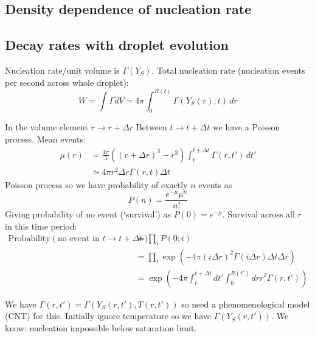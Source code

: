 \documentclass[12pt]{report}
\begin{document}
\subsection{Density dependence of nucleation rate}
\subsection{Decay rates with droplet evolution}

Nucleation rate/unit volume is $\Gamma(Y_S)$.
Total nucleation rate (nucleation events per second across whole droplet):
\begin{equation}
  W = \int \Gamma dV
  = 4\pi \int_0^{R(t)} \Gamma(Y_S(r); t) \, dr
\end{equation}

In the volume element $r \to r + \Delta r$ Between $t \to t+\Delta t$ we have a Poisson process.
Mean events:
\begin{equation}
  \begin{aligned}
    \mu(r) &= \frac{4\pi}{3} ( (r+\Delta r)^3 - r^3)
    \int_t^{t+\Delta t} \Gamma(r,t') \, dt' \\
    &\simeq
    4\pi r^2 \Delta r \Gamma(r, t) \Delta t
  \end{aligned}
\end{equation}
Poisson process so we have probability of exactly $n$ events as
\begin{equation}
  P(n) = \frac{e^{-\mu} \mu^n}{n!}
\end{equation}
Giving probability of no event (`survival') as $P(0) = e^{-\mu}$.
Survival across all $r$ in this time period:
\begin{equation}
  \begin{aligned}
  \textrm{Probability}\left( \textrm{no event in } t \to t + \Delta t \right)
  &= \prod_i P(0;i) \\
  &= \prod_i \exp{\left(-4\pi (i\Delta r)^2 \Gamma(i\Delta r) \Delta t \Delta r\right)} \\
  &= \exp{\left(
    -4\pi \int_t^{t+\Delta t} dt' \int_0^{R(t')} dr r^2 \Gamma(r, t')
    \right)}
  \end{aligned}
\end{equation}

We have $\Gamma(r,t') = \Gamma(Y_S(r,t'), T(r,t'))$ so need a phenomenological model (CNT) for this.
Initially ignore temperature so we have $\Gamma(Y_S(r,t'))$.
We know: nucleation impossible below saturation limit.
\end{document}
